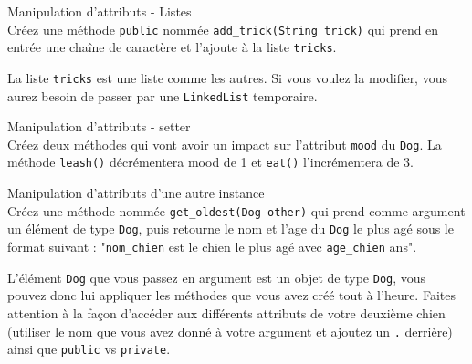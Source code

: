 \begin{Exercice}[5 minutes] Manipulation d'attributs - Listes\\
    Créez une méthode \lstinline{public} nommée \lstinline{add_trick(String trick)} qui prend en entrée une chaîne de caractère et l'ajoute à la liste \lstinline{tricks}. \\
   	
\begin{conseil}
   La liste \lstinline{tricks} est une liste comme les autres. Si vous voulez la modifier, vous aurez besoin de passer par une \lstinline{LinkedList} temporaire.
\end{conseil}
    
\begin{solution}
	
\end{solution}
\end{Exercice}

\begin{Exercice}[5 minutes] Manipulation d'attributs - setter\\
    Créez deux méthodes qui vont avoir un impact sur l'attribut \lstinline{mood} du \lstinline{Dog}. La méthode \lstinline{leash()} décrémentera mood de 1 et \lstinline{eat()} l'incrémentera de 3. \\

\begin{solution}
	
\end{solution}
\end{Exercice}

\begin{Exercice}[5 minutes] Manipulation d'attributs d'une autre instance\\
    Créez une méthode nommée \lstinline{get_oldest(Dog other)} qui prend comme argument un élément de type \lstinline{Dog}, puis retourne le nom et l'age du \lstinline{Dog} le plus agé sous le format suivant : "\lstinline{nom_chien} est le chien le plus agé avec \lstinline{age_chien} ans". \\
   	
\begin{conseil}
   L'élément \lstinline{Dog} que vous passez en argument est un objet de type \lstinline{Dog}, vous pouvez donc lui appliquer les méthodes que vous avez créé tout à l'heure.
   Faites attention à la façon d'accéder aux différents attributs de votre deuxième chien (utiliser le nom que vous avez donné à votre argument et ajoutez un \lstinline{.}  derrière) ainsi que \lstinline{public} vs \lstinline{private}. 
\end{conseil}
    
\begin{solution}
	
\end{solution}
\end{Exercice}

